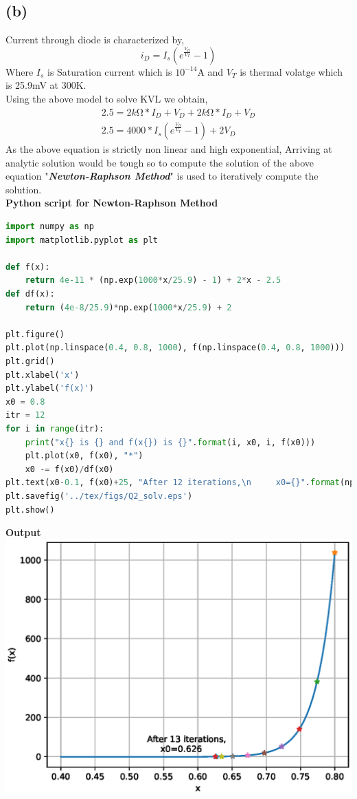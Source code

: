 \documentclass{article}
\begin{document}
\subsection*{(b)}
Current through diode is characterized by,
\begin{equation*}
i_D = I_s\left(e^{\frac{V_D}{V_T}} - 1\right)
\end{equation*}
Where $I_s$ is Saturation current which is $10^{-14}$A and $V_T$ is thermal volatge which is 25.9mV at 300K.\\
Using the above model to solve KVL we obtain,\\
\begin{gather*}
2.5 = 2k{\si{\ohm}}*I_D + V_D + 2k{\si{\ohm}}*I_D + V_D\\
2.5 = 4000*I_s\left(e^{\frac{V_D}{V_T}} - 1\right) + 2V_D
\end{gather*}
As the above equation is strictly non linear and high exponential, Arriving at analytic solution would be tough so to compute the solution of the above equation "\textit{\textbf{Newton-Raphson Method}}" is used to iteratively compute the solution.\\
\textbf{Python script for Newton-Raphson Method}\\
\begin{lstlisting}[language=python]
import numpy as np
import matplotlib.pyplot as plt

def f(x):
	return 4e-11 * (np.exp(1000*x/25.9) - 1) + 2*x - 2.5
def df(x):
	return (4e-8/25.9)*np.exp(1000*x/25.9) + 2

plt.figure()
plt.plot(np.linspace(0.4, 0.8, 1000), f(np.linspace(0.4, 0.8, 1000)))
plt.grid()
plt.xlabel('x')
plt.ylabel('f(x)')
x0 = 0.8
itr = 12
for i in range(itr):
	print("x{} is {} and f(x{}) is {}".format(i, x0, i, f(x0)))
	plt.plot(x0, f(x0), "*")
	x0 -= f(x0)/df(x0)
plt.text(x0-0.1, f(x0)+25, "After 12 iterations,\n     x0={}".format(np.round(x0, 3)))
plt.savefig('../tex/figs/Q2_solv.eps')
plt.show()
\end{lstlisting}
\textbf{Output}\\
\includegraphics[scale=0.5]{./figs/Q2_solv.eps}\\
\end{document}
